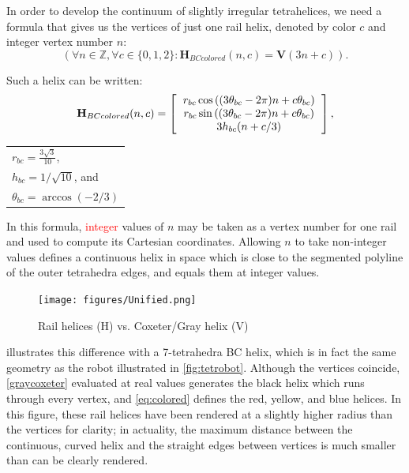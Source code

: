\documentclass[twocolumn,10pt]{asme2ej}
\renewcommand{\vec}[1]{\mathbf{#1}}
\newcommand{\highlighttext}[1] {\textcolor{red}{#1}}
\begin{document}
In order to develop the continuum of slightly irregular tetrahelices,
we need a formula that gives us the vertices of just
one rail helix, denoted by color $c$ and integer vertex number $n$:
\[
(\forall n \in \mathbb{Z}, \forall c \in \{0,1,2\} : \vec{H}_{BCcolored}(n,c) = \vec{V}(3n +c)) .
\]

Such a helix can be written:
\begin{equation}
  \label{eq:colored}
 \vec{H}_{BCcolored}(n,c) =
\left [
  \begin{tabular}{c}
   $ r_{bc}  \cos{((3 \theta_{bc} - 2 \pi)n + c  \theta_{bc})}  $\\
   $ r_{bc} \sin{((3 \theta_{bc} - 2 \pi)n + c  \theta_{bc})} $\\
   $ 3 h_{bc} (n + c/3)  $
  \end{tabular}
  \right ],
\end{equation}
  \begin{tabular}{l}
 $ r_{bc} = \frac{3\sqrt{3}}{10} $,\\
 $ h_{bc} = 1/\sqrt{10} $, and \\
 $ \theta_{bc} = \arccos(-2/3) $ \text{.}\\
  \end{tabular}      

In this formula, \highlighttext{integer} values of $n$ may be taken as a vertex number for one rail and used to compute
its Cartesian
coordinates. Allowing $n$ to take non-integer values defines a continuous
helix in space which is close to the segmented polyline of the outer
tetrahedra edges, and equals them at integer
values.

\begin{figure}
  \centering
     \texttt{[image: figures/Unified.png]}
     \caption{Rail helices (H) vs. Coxeter/Gray helix (V) }
  \label{fig:helixcomparison}  
\end{figure}

 illustrates this difference with a 7-tetrahedra BC helix, which is
in fact the same geometry as the robot illustrated in \cref{fig:tetrobot}.
Although the vertices coincide,
 \cref{graycoxeter} evaluated
at real values generates the black helix which runs through every vertex, and \cref{eq:colored} defines
the red, yellow, and blue helices. In this figure,
these rail helices have been rendered at a slightly higher radius than the vertices for clarity;
in actuality, the maximum distance between the continuous, curved helix and the
straight edges between vertices is much smaller than can be clearly rendered.
\end{document}
